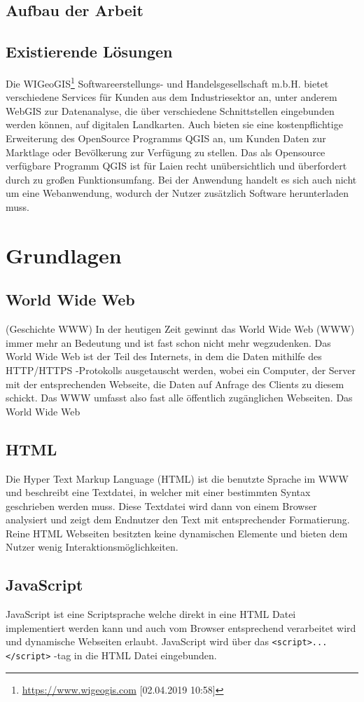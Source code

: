 \documentclass[a4paper, twoside, 12pt]{scrreprt}
\begin{document}
\section{Aufbau der Arbeit}
\section{Existierende Lösungen}
Die WIGeoGIS\footnote{\url{https://www.wigeogis.com} [02.04.2019 10:58]} Softwareerstellungs- und Handelsgesellschaft m.b.H. bietet verschiedene Services für Kunden aus dem Industriesektor an, unter anderem WebGIS zur Datenanalyse, die über verschiedene Schnittstellen eingebunden werden können, auf digitalen Landkarten. 
Auch bieten sie eine kostenpflichtige Erweiterung des OpenSource Programms QGIS an, um Kunden Daten zur Marktlage oder Bevölkerung zur Verfügung zu stellen.
Das als Opensource verfügbare Programm QGIS ist für Laien recht unübersichtlich und überfordert durch zu großen Funktionsumfang. Bei der Anwendung handelt es sich auch nicht um eine Webanwendung, wodurch der Nutzer zusätzlich Software herunterladen muss.

\chapter{Grundlagen}
\section{World Wide Web}
(Geschichte WWW)
In der heutigen Zeit gewinnt das World Wide Web (WWW) immer mehr an Bedeutung und ist fast schon nicht mehr wegzudenken.
Das World Wide Web ist der Teil des Internets, in dem die Daten mithilfe des HTTP/HTTPS -Protokolls ausgetauscht werden, wobei ein Computer, der Server mit der entsprechenden Webseite, die Daten auf Anfrage des Clients zu diesem schickt.
Das WWW umfasst also fast alle öffentlich zugänglichen Webseiten.
Das World Wide Web~\citep{www}
\section{HTML}
Die Hyper Text Markup Language (HTML) ist die benutzte Sprache im WWW und beschreibt eine Textdatei, in welcher mit einer bestimmten Syntax geschrieben werden muss.
Diese Textdatei wird dann von einem Browser analysiert und zeigt dem Endnutzer den Text mit entsprechender Formatierung.
Reine HTML Webseiten besitzten keine dynamischen Elemente und bieten dem Nutzer wenig Interaktionsmöglichkeiten.
\section{JavaScript}
JavaScript ist eine Scriptsprache welche direkt in eine HTML Datei implementiert werden kann und auch vom Browser entsprechend verarbeitet wird und dynamische Webseiten erlaubt.
JavaScript wird über das \verb+<script>...</script>+ -tag in die HTML Datei eingebunden.
\end{document}
